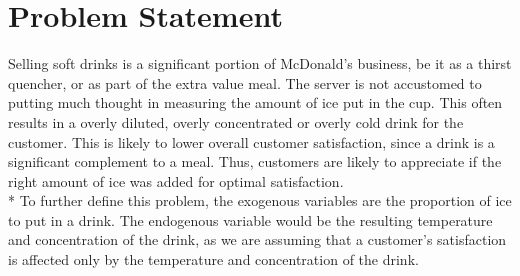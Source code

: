 \documentclass[12pt,letterpaper]{article}
\theoremstyle{definition}
\begin{document}
\section{Problem Statement}

Selling soft drinks is a significant portion of McDonald's business, be it as a thirst quencher, or as part of the extra value meal. The server is not accustomed to putting much thought in measuring the amount of ice put in the cup. This often results in a overly diluted, overly concentrated or overly cold drink for the customer. This is likely to lower overall customer satisfaction, since a drink is a significant complement to a meal. Thus, customers are likely to appreciate if the right amount of ice was added for optimal satisfaction.
\\* To further define this problem, the exogenous variables are the proportion of ice to put in a drink. The endogenous variable would be the resulting temperature and concentration of the drink, as we are assuming that a customer's satisfaction is affected only by the temperature and concentration of the drink.
\end{document}
